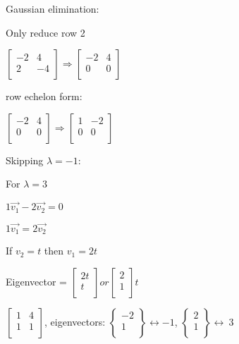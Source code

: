 \documentclass{extarticle}
\begin{document}
\begin{multicols}{4}
Gaussian elimination:

Only reduce row 2

$\left[\begin{matrix}-2&4\\2&-4\\\end{matrix}\right]\Rightarrow\left[\begin{matrix}-2&4\\0&0\\\end{matrix}\right]$

row echelon form:

$\left[\begin{matrix}-2&4\\0&0\\\end{matrix}\right]\Rightarrow\left[\begin{matrix}1&-2\\0&0\\\end{matrix}\right]$

Skipping $\lambda=-1$:

For $\lambda=3$

$1\vec{v_1}-2\vec{v_2}=0$

$1\vec{v_1}=2\vec{v_2}$

If $v_2=t$ then $v_1=2t$

Eigenvector = $\left[\begin{matrix}2t\\t\\\end{matrix}\right] or \left[\begin{matrix}2\\1\\\end{matrix}\right]t$



$\left[\begin{matrix}1&4\\1&1\\\end{matrix}\right]$, eigenvectors: $\left\{\begin{matrix}-2\\1\\\end{matrix}\right\}\leftrightarrow-1$, $\left\{\begin{matrix}2\\1\\\end{matrix}\right\}\leftrightarrow\ 3$


\end{multicols}
\end{document}
